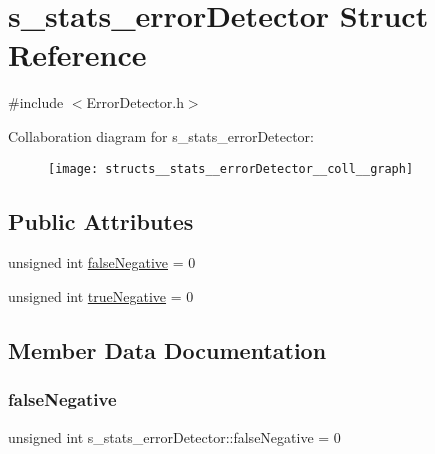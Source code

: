 \hypertarget{structs__stats__errorDetector}{}\section{s\+\_\+stats\+\_\+error\+Detector Struct Reference}
\label{structs__stats__errorDetector}


{\ttfamily \#include $<$Error\+Detector.\+h$>$}



Collaboration diagram for s\+\_\+stats\+\_\+error\+Detector\+:\nopagebreak
\begin{figure}[H]
\begin{center}
\leavevmode
\texttt{[image: structs\_\_stats\_\_errorDetector\_\_coll\_\_graph]}
\end{center}
\end{figure}
\subsection*{Public Attributes}
\begin{DoxyCompactItemize}
\item 
unsigned int \hyperlink{structs__stats__errorDetector_a612288d77cf4bd7c6244474fb738768d}{false\+Negative} = 0
\item 
unsigned int \hyperlink{structs__stats__errorDetector_ad37aeef79761af921bb44f31024c78ce}{true\+Negative} = 0
\end{DoxyCompactItemize}


\subsection{Member Data Documentation}
\mbox{\label{structs__stats__errorDetector_a612288d77cf4bd7c6244474fb738768d}} 
\subsubsection{\texorpdfstring{false\+Negative}{falseNegative}}
{\footnotesize\ttfamily unsigned int s\+\_\+stats\+\_\+error\+Detector\+::false\+Negative = 0}

\mbox{\label{structs__stats__errorDetector_ad37aeef79761af921bb44f31024c78ce}} 

